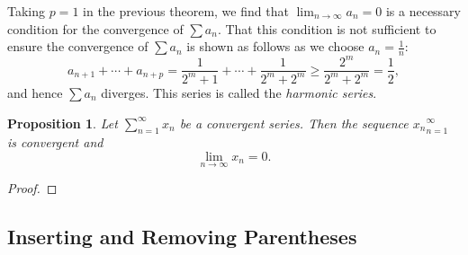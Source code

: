 \documentclass{article}
\newtheorem{prop}[theorem]{Proposition}
\theoremstyle{definition}
\begin{document}
Taking $p=1$ in the previous theorem, we find that $\lim_{n\rightarrow \infty}a_{n}=0$ is 
a necessary condition for the convergence of $\sum a_{n}$. That this condition is not sufficient
to ensure the convergence of $\sum a_{n}$ is shown as follows as we choose $a_{n}=\frac{1}{n}$:
$$a_{n+1}+\cdots+a_{n+p}=\frac{1}{2^{m}+1}+\cdots+\frac{1}{2^{m}+2^{m}}\geq\frac{2^{m}}{2^{m}+2^{m}}=\frac{1}{2},$$
and hence $\sum a_{n}$ diverges. This series is called the \textit{harmonic series}.

\begin{prop}
    Let $\sum_{n=1}^{\infty}x_{n}$ be a convergent series. Then the sequence 
    ${x_{n}}_{n=1}^{\infty}$ is convergent and $$\lim_{n\rightarrow \infty}x_{n} = 0.$$
\end{prop}

\begin{proof}
    
\end{proof}





\subsection{Inserting and Removing Parentheses}
\end{document}
